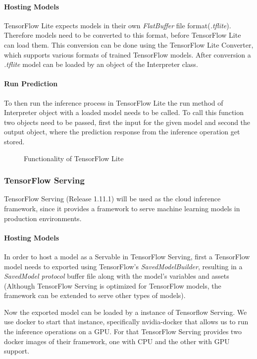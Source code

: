 \paragraph{Hosting Models}
TensorFlow Lite expects models in their own \emph{FlatBuffer} file  format(\emph{.tflite}). Therefore models need to be converted to this format, before TensorFlow Lite can load them. This conversion can be done using the TensorFlow Lite Converter, which supports various formats of trained TensorFlow models.
After conversion a \emph{.tflite} model can be loaded by an object of the Interpreter class.
\paragraph{Run Prediction}

To then run the inference process in TensorFlow Lite the run method of Interpreter object with a loaded model needs to be called. To call this function two objects need to be passed, first the input for the given model and second the output object, where the prediction response from the inference operation get stored. 
\begin{figure}[H]
\centering

\caption{Functionality of TensorFlow Lite}
\label{fig:edge}
\end{figure}
\subsubsection{TensorFlow Serving}
\label{chap:TFServing}
TensorFlow Serving (Release 1.11.1) will be used as the cloud inference framework, since it provides a framework to serve machine learning models in production environments. 



\paragraph{Hosting Models}
In order to host a model as a Servable in TensorFlow Serving, first a TensorFlow model needs to exported using TensorFlow's \emph{SavedModelBuilder}, resulting in a \emph{SavedModel protocol} buffer file along with the model’s variables and assets (Although TensorFlow Serving is optimized for TensorFlow models, the framework can be extended to serve other types of models).

Now the exported model can be loaded by a instance of Tensorflow Serving.
We use docker to start that instance, specifically nvidia-docker that allows us to run the inference operations on a GPU. For that TensorFlow Serving provides two docker images of their framework, one with CPU and the other with GPU support.

